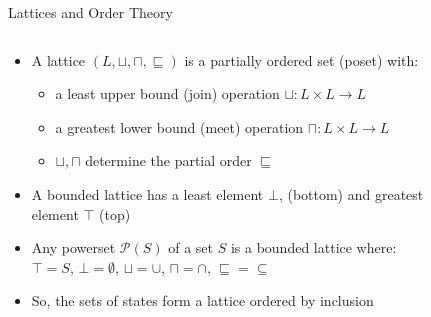 \documentclass[aspectratio=169]{beamer}
\begin{document}
\begingroup
\small
\begin{frame}{Lattices and Order Theory}
  \begin{columns}[T]
  \begin{column}{0.6\textwidth}
  \begin{itemize}
  \item A lattice $(L, \sqcup, \sqcap, \sqsubseteq)$ is a partially ordered set (poset) with:
    \begin{itemize}\footnotesize
    \item a least upper bound (join) operation $\sqcup: L \times L \to L$
    \item a greatest lower bound (meet) operation $\sqcap: L \times L \to L$
    \item $\sqcup, \sqcap$ determine the partial order $\sqsubseteq$
    \end{itemize}
  \item<9-> A bounded lattice has a least element $\bot$, (bottom)
    and greatest element $\top$ (top)
  \item<10-> Any powerset $\mathcal{P}(S)$ of a set $S$ is a bounded lattice where:
     $\top = S$,
     $\bot = \emptyset$,
     $\sqcup = \cup$,
     $\sqcap = \cap$,
     $\sqsubseteq = \subseteq$
   \item<11-> So, the sets of states form a lattice ordered by inclusion
  \end{itemize}
  \end{column}
  \begin{column}{0.4\textwidth}
    \begin{figure}[h]
    \centering

\end{figure}
\end{column}
\end{columns}
\end{frame}
\end{document}
